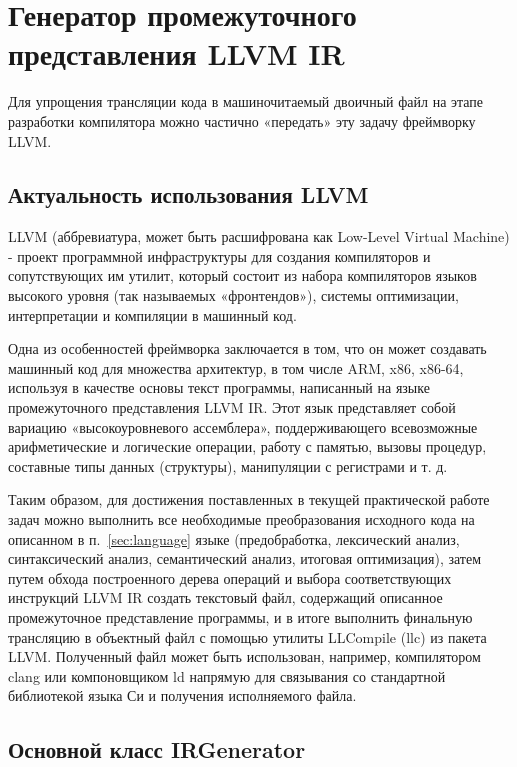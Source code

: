 \newpage
\section{Генератор промежуточного представления LLVM IR}

Для упрощения трансляции кода в машиночитаемый двоичный файл на этапе разработки компилятора можно частично «передать» эту задачу фреймворку LLVM.

\subsection{Актуальность использования LLVM}

LLVM (аббревиатура, может быть расшифрована как Low-Level Virtual Machine) - проект программной инфраструктуры для создания компиляторов и сопутствующих им утилит, который состоит из набора компиляторов языков высокого уровня (так называемых «фронтендов»), системы оптимизации, интерпретации и компиляции в машинный код.

Одна из особенностей фреймворка заключается в том, что он может создавать машинный код для множества архитектур, в том числе ARM, x86, x86-64, используя в качестве основы текст программы, написанный на языке промежуточного представления LLVM IR.
Этот язык представляет собой вариацию «высокоуровневого ассемблера», поддерживающего всевозможные арифметические и логические операции, работу с памятью, вызовы процедур, составные типы данных (структуры), манипуляции с регистрами и т. д.

Таким образом, для достижения поставленных в текущей практической работе задач можно выполнить все необходимые преобразования исходного кода на описанном в п.~\ref{sec:language} языке (предобработка, лексический анализ, синтаксический анализ, семантический анализ, итоговая оптимизация), затем путем обхода построенного дерева операций и выбора соответствующих инструкций LLVM IR создать текстовый файл, содержащий описанное промежуточное представление программы, и в итоге выполнить финальную трансляцию в объектный файл с помощью утилиты LLCompile (llc) из пакета LLVM.
Полученный файл может быть использован, например, компилятором clang или компоновщиком ld напрямую для связывания со стандартной библиотекой языка Си и получения исполняемого файла.

\subsection{Основной класс IRGenerator}

